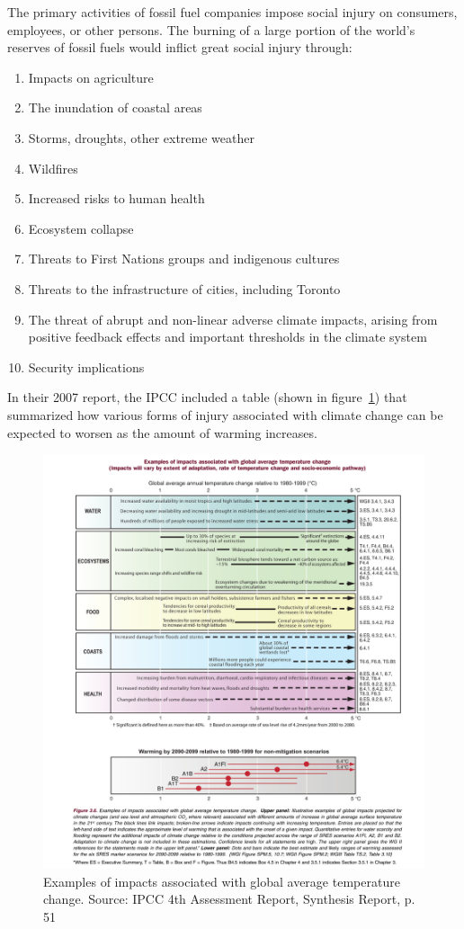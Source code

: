 The primary activities of fossil fuel companies impose social injury on consumers, employees, or other persons.
The burning of a large portion of the world's reserves of fossil fuels would inflict great social injury through:
\begin{enumerate}
\item Impacts on agriculture
\item The inundation of coastal areas
\item Storms, droughts, other extreme weather
\item Wildfires
\item Increased risks to human health
\item Ecosystem collapse 
\item Threats to First Nations groups and indigenous cultures
\item Threats to the infrastructure of cities, including Toronto
\item The threat of abrupt and non-linear adverse climate impacts, arising from positive feedback effects and important thresholds in the climate system
\item Security implications
\end{enumerate}
In their 2007 report, the IPCC included a table (shown in figure~\ref{fig:IPCCImpacts}) that summarized how various forms of injury associated with climate change can be expected to worsen as the amount of warming increases.



\begin{figure}
\includegraphics[width=160mm]{s3-variousimpacts.png}
\centering
\caption{Examples of impacts associated with global average temperature change. Source: IPCC 4th Assessment Report, Synthesis Report, p. 51}
\label{fig:IPCCImpacts}
\end{figure}



